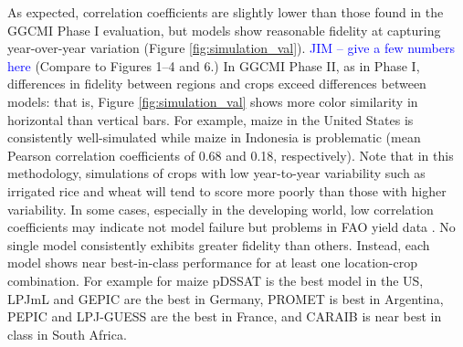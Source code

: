 \documentclass[gmd, manuscript]{copernicus} %
\begin{document}
As expected, correlation coefficients are slightly lower than those found in the GGCMI Phase I evaluation, but models show reasonable fidelity at capturing year-over-year variation (Figure \ref{fig:simulation_val}). 
\textcolor{blue}{JIM -- give a few numbers here}
(Compare to \citet{muller_global_2017} Figures 1--4 and 6.)  
In GGCMI Phase II, as in Phase I, differences in fidelity between regions and crops exceed differences between models: 
that is, Figure \ref{fig:simulation_val} shows more color similarity in horizontal than vertical bars. 
For example, maize in the United States is consistently well-simulated while maize in Indonesia is problematic (mean Pearson correlation coefficients of 0.68 and 0.18, respectively). 
Note that in this methodology, simulations of crops with low year-to-year variability such as irrigated rice and wheat will tend to score more poorly than those with higher variability.
In some cases, especially in the developing world, low correlation coefficients may indicate not model failure but problems in FAO yield data \citep{Ray2012, muller_global_2017}. 
No single model consistently exhibits greater fidelity than others. 
Instead, each model shows near best-in-class performance for at least one location-crop combination. For example for maize pDSSAT is the best model in the US, LPJmL and GEPIC are the best in Germany, PROMET is best in Argentina, PEPIC and LPJ-GUESS are the best in France, and CARAIB is near best in class in South Africa. 

\end{document}
